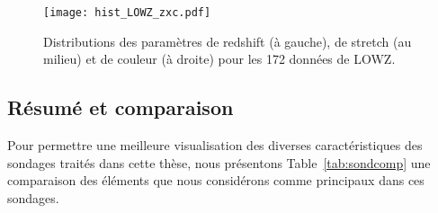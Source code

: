 \documentclass[../main/main.tex]{subfiles}
\begin{document}
\begin{figure}[ht]
    \centering
    \texttt{[image: hist\_LOWZ\_zxc.pdf]}
    \captionsetup{justification=centering}
    \caption{Distributions des paramètres de redshift (à gauche), de stretch (au
    milieu) et de couleur (à droite) pour les 172 données de LOWZ.}
    \label{fig:lowzhist}
\end{figure}

\subsection{Résumé et comparaison}\label{ssec:sondcomp}

Pour permettre une meilleure visualisation des diverses caractéristiques des
sondages traités dans cette thèse, nous présentons Table~\ref{tab:sondcomp} une
comparaison des éléments que nous considérons comme principaux dans ces
sondages.
\end{document}
